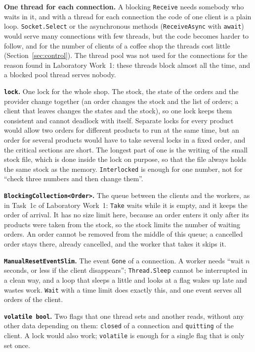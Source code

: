 \documentclass[12pt,a4paper]{article}
\begin{document}
\textbf{One thread for each connection.} A blocking \texttt{Receive} needs somebody who waits in it, and with a thread for each connection the code of one client is a plain loop. \texttt{Socket.Select} or the asynchronous methods (\texttt{ReceiveAsync} with \texttt{await}) would serve many connections with few threads, but the code becomes harder to follow, and for the number of clients of a coffee shop the threads cost little (Section~\ref{sec:control}). The thread pool was not used for the connections for the reason found in Laboratory Work~1: these threads block almost all the time, and a blocked pool thread serves nobody.

\textbf{\texttt{lock}.} One lock for the whole shop. The stock, the state of the orders and the provider change together (an order changes the stock and the list of orders; a client that leaves changes the states and the stock), so one lock keeps them consistent and cannot deadlock with itself. Separate locks for every product would allow two orders for different products to run at the same time, but an order for several products would have to take several locks in a fixed order, and the critical sections are short. The longest part of one is the writing of the small stock file, which is done inside the lock on purpose, so that the file always holds the same stock as the memory. \texttt{Interlocked} is enough for one number, not for ``check three numbers and then change them''.

\textbf{\texttt{BlockingCollection<Order>}.} The queue between the clients and the workers, as in Task~1c of Laboratory Work~1: \texttt{Take} waits while it is empty, and it keeps the order of arrival. It has no size limit here, because an order enters it only after its products were taken from the stock, so the stock limits the number of waiting orders. An order cannot be removed from the middle of this queue; a cancelled order stays there, already cancelled, and the worker that takes it skips it.

\textbf{\texttt{ManualResetEventSlim}.} The event \texttt{Gone} of a connection. A worker needs ``wait $n$ seconds, or less if the client disappears''; \texttt{Thread.Sleep} cannot be interrupted in a clean way, and a loop that sleeps a little and looks at a flag wakes up late and wastes work. \texttt{Wait} with a time limit does exactly this, and one event serves all orders of the client.

\textbf{\texttt{volatile bool}.} Two flags that one thread sets and another reads, without any other data depending on them: \texttt{closed} of a connection and \texttt{quitting} of the client. A lock would also work; \texttt{volatile} is enough for a single flag that is only set once.
\end{document}
